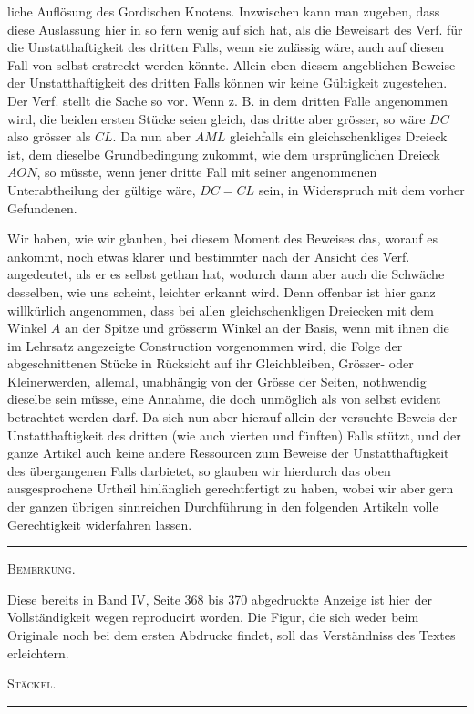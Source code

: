 liche Auflösung des Gordischen Knotens. Inzwischen kann man zugeben, dass diese Auslassung
hier in so fern wenig auf sich hat, als die Beweisart des Verf. für die Unstatthaftigkeit des
dritten Falls, wenn sie zulässig wäre, auch auf diesen Fall von selbst erstreckt werden könnte.
Allein eben diesem angeblichen Beweise der Unstatthaftigkeit des dritten Falls können wir keine
Gültigkeit zugestehen. Der Verf. stellt die Sache so vor. Wenn z. B. in dem dritten Falle
angenommen wird, die beiden ersten Stücke seien gleich, das dritte aber grösser, so wäre
$DC$ also grösser als $CL$. Da nun aber $AML$ gleichfalls ein gleichschenkliges Dreieck ist,
dem dieselbe Grundbedingung zukommt, wie dem ursprünglichen Dreieck $AON$, so müsste, wenn
jener dritte Fall mit seiner angenommenen Unterabtheilung der gültige wäre, $DC=CL$ sein,
in Widerspruch mit dem vorher Gefundenen.

Wir haben, wie wir glauben, bei diesem Moment des Beweises das, worauf es ankommt, noch etwas
klarer und bestimmter nach der Ansicht des Verf. angedeutet, als er es selbst gethan hat,
wodurch dann aber auch die Schwäche desselben, wie uns scheint, leichter erkannt wird. Denn
offenbar ist hier ganz willkürlich angenommen, dass bei allen gleichschenkligen Dreiecken mit
dem Winkel $A$ an der Spitze und grösserm Winkel an der Basis, wenn mit ihnen die im Lehrsatz
angezeigte Construction vorgenommen wird, die Folge der abgeschnittenen Stücke in Rücksicht
auf ihr Gleichbleiben, Grösser- oder Kleinerwerden, allemal, unabhängig von der Grösse der
Seiten, nothwendig dieselbe sein müsse, eine Annahme, die doch unmöglich als von selbst evident
betrachtet werden darf. Da sich nun aber hierauf allein der versuchte Beweis der
Unstatthaftigkeit des dritten (wie auch vierten und fünften) Falls stützt, und der ganze Artikel
auch keine andere Ressourcen zum Beweise der Unstatthaftigkeit des übergangenen Falls
darbietet, so glauben wir hierdurch das oben ausgesprochene Urtheil hinlänglich gerechtfertigt
zu haben, wobei wir aber gern der ganzen übrigen sinnreichen Durchführung in den folgenden
Artikeln volle Gerechtigkeit widerfahren lassen.

\begin{center}\rule{3cm}{0.4pt}\end{center}

\begin{center}\textsc{Bemerkung.}\end{center}

{\small
Diese bereits in Band IV, Seite 368 bis 370 abgedruckte Anzeige ist hier der Vollständigkeit
wegen reproducirt worden. Die Figur, die sich weder beim Originale noch bei dem ersten
Abdrucke findet, soll das Verständniss des Textes erleichtern.

\begin{flushright}\textsc{Stäckel.}\end{flushright}
}

\begin{center}\rule{3cm}{0.4pt}\end{center}
